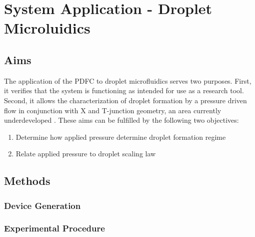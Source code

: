 \chapter{System Application - Droplet Microluidics}
\section{Aims}
The application of the PDFC to droplet microfluidics serves two purposes. First, it verifies that the system is functioning as intended for use as a research tool. Second, it allows the characterization of droplet formation by a pressure driven flow in conjunction with X and T-junction geometry, an area currently underdeveloped \cite{Christopher2008}. These aims can be fulfilled by the following two objectives:

\begin{enumerate}
\item Determine how applied pressure determine droplet formation regime
\item Relate applied pressure to droplet scaling law \cite{Zhao2011}
\end{enumerate}
\section{Methods}
\subsection{Device Generation}

\subsection{Experimental Procedure}

